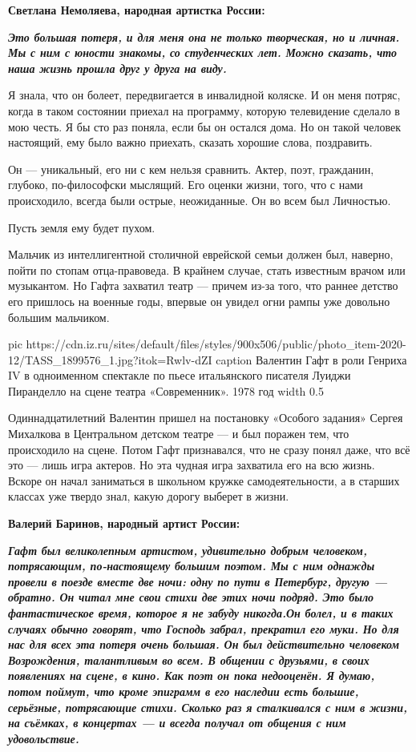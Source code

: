  \def\styleMP{\em\large\bfseries\color{blue}}

\textbf{Светлана Немоляева, народная артистка России:}

\begingroup
\styleMP
Это большая потеря, и для меня она не только творческая, но и личная. Мы с ним
с юности знакомы, со студенческих лет. Можно сказать, что наша жизнь прошла
друг у друга на виду.

Я знала, что он болеет, передвигается в инвалидной коляске. И он меня потряс,
когда в таком состоянии приехал на программу, которую телевидение сделало в мою
честь. Я бы сто раз поняла, если бы он остался дома. Но он такой человек
настоящий, ему было важно приехать, сказать хорошие слова, поздравить.

Он — уникальный, его ни с кем нельзя сравнить. Актер, поэт, гражданин, глубоко,
по-философски мыслящий. Его оценки жизни, того, что с нами происходило, всегда
были острые, неожиданные. Он во всем был Личностью.

Пусть земля ему будет пухом.
\endgroup


Мальчик из интеллигентной столичной еврейской семьи должен был, наверно, пойти
по стопам отца-правоведа. В крайнем случае, стать известным врачом или
музыкантом. Но Гафта захватил театр — причем из-за того, что раннее детство его
пришлось на военные годы, впервые он увидел огни рампы уже довольно большим
мальчиком. 

\ifcmt
  pic https://cdn.iz.ru/sites/default/files/styles/900x506/public/photo_item-2020-12/TASS_1899576_1.jpg?itok=Rwlv-dZI
  caption Валентин Гафт в роли Генриха IV в одноименном спектакле по пьесе итальянского писателя Луиджи Пиранделло на сцене театра «Современник». 1978 год
  width 0.5
\fi

Одиннадцатилетний Валентин пришел на постановку «Особого задания» Сергея
Михалкова в Центральном детском театре — и был поражен тем, что происходило на
сцене. Потом Гафт признавался, что не сразу понял даже, что всё это — лишь игра
актеров. Но эта чудная игра захватила его на всю жизнь. Вскоре он начал
заниматься в школьном кружке самодеятельности, а в старших классах уже твердо
знал, какую дорогу выберет в жизни.

\textbf{Валерий Баринов, народный артист России:}
  
\begingroup
\styleMP
Гафт был великолепным артистом, удивительно добрым человеком, потрясающим,
по-настоящему большим поэтом. Мы с ним однажды провели в поезде вместе две
ночи: одну по пути в Петербург, другую — обратно. Он читал мне свои стихи
две этих ночи подряд. Это было фантастическое время, которое я не забуду
никогда.Он болел, и в таких случаях обычно говорят, что Господь забрал,
прекратил его муки. Но для нас для всех эта потеря очень большая. Он был
действительно человеком Возрождения, талантливым во всем. В общении с
друзьями, в своих появлениях на сцене, в кино. Как поэт он пока недооценён.
Я думаю, потом поймут, что кроме эпиграмм в его наследии есть большие,
серьёзные, потрясающие стихи. Сколько раз я сталкивался с ним в жизни, на
съёмках, в концертах — и всегда получал от общения с ним удовольствие.
\endgroup

